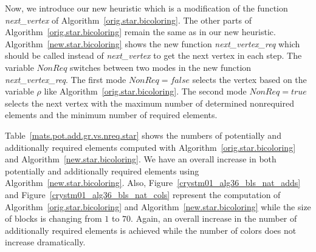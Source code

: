 \documentclass[12pt, twoside,a4paper,toc=bibliography]{scrbook}
\newcommand{\figref}[1]{Figure~\protect\ref{#1}}
\newcommand{\coderef}[1]{Algorithm~\protect\ref{#1}}
\begin{document}
Now, we introduce our new heuristic  which is a modification of the function \textit{next\_vertex} 
of \coderef{orig.star.bicoloring}. The other parts of \coderef{orig.star.bicoloring} remain the same as
in our new heuristic.
\coderef{new.star.bicoloring} shows the new function \textit{next\_vertex\_req} which should be called
instead of \textit{next\_vertex} to get the next vertex in each step.
The variable $NonReq$ switches between two modes in the new function \textit{next\_vertex\_req}.
The first mode $NonReq=false$ selects the vertex 
based on the variable $\rho$ like \coderef{orig.star.bicoloring}. 
The second mode $NonReq=true$ selects
the next vertex with the maximum number of determined nonrequired elements
and the minimum number of required elements.

Table~\ref{mats.pot.add.gr.vs.nreq.star} shows the numbers of potentially and additionally required elements
computed with \coderef{orig.star.bicoloring} and \coderef{new.star.bicoloring}. 
We have an overall increase in both potentially and additionally required elements using \coderef{new.star.bicoloring}.
Also, \figref{crystm01_alg36_bls_nat_adds} and \figref{crystm01_alg36_bls_nat_cols} represent the computation of
\coderef{orig.star.bicoloring} and \coderef{new.star.bicoloring} while the size of blocks is changing from $1$ to $70$.
Again, an overall increase in the number of additionally required elements is achieved while the number of colors
does not increase dramatically.
\end{document}
